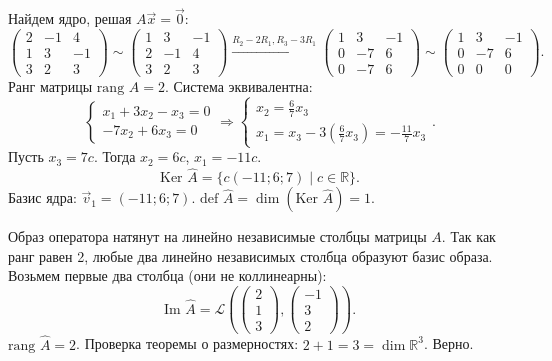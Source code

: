 \documentclass[12pt,a4paper]{article}
\theoremstyle{plain}
\theoremstyle{definition}
\begin{document}
\begin{solbox}
    Найдем ядро, решая $A\vec{x}=\vec{0}$:
    \[
    \begin{pmatrix} 2 & -1 & 4 \\ 1 & 3 & -1 \\ 3 & 2 & 3 \end{pmatrix} \sim \begin{pmatrix} 1 & 3 & -1 \\ 2 & -1 & 4 \\ 3 & 2 & 3 \end{pmatrix} \xrightarrow{R_2-2R_1, R_3-3R_1} \begin{pmatrix} 1 & 3 & -1 \\ 0 & -7 & 6 \\ 0 & -7 & 6 \end{pmatrix} \sim \begin{pmatrix} 1 & 3 & -1 \\ 0 & -7 & 6 \\ 0 & 0 & 0 \end{pmatrix}.
    \]
    Ранг матрицы $\text{rang } A = 2$.
    Система эквивалентна:
    \[
    \begin{cases} x_1 + 3x_2 - x_3 = 0 \\ -7x_2 + 6x_3 = 0 \end{cases} \Rightarrow \begin{cases} x_2 = \frac{6}{7}x_3 \\ x_1 = x_3 - 3(\frac{6}{7}x_3) = -\frac{11}{7}x_3 \end{cases}.
    \]
    Пусть $x_3 = 7c$. Тогда $x_2 = 6c$, $x_1 = -11c$.
    \[
    \text{Ker } \hat{A} = \{ c(-11; 6; 7) \mid c \in \mathbb{R} \}.
    \]
    Базис ядра: $\vec{v}_1 = (-11; 6; 7)$.
    $\text{def } \hat{A} = \dim(\text{Ker } \hat{A}) = 1$.

    Образ оператора натянут на линейно независимые столбцы матрицы $A$. Так как ранг равен 2, любые два линейно независимых столбца образуют базис образа. Возьмем первые два столбца (они не коллинеарны):
    \[
    \text{Im } \hat{A} = \mathcal{L} \left( \begin{pmatrix} 2 \\ 1 \\ 3 \end{pmatrix}, \begin{pmatrix} -1 \\ 3 \\ 2 \end{pmatrix} \right).
    \]
    $\text{rang } \hat{A} = 2$.
    Проверка теоремы о размерностях: $2 + 1 = 3 = \dim \mathbb{R}^3$. Верно.


\end{solbox}
\end{document}
